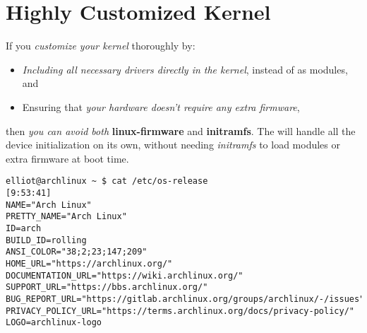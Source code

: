 
\newpage

\section{Highly Customized Kernel}
If you \textit{customize your kernel} thoroughly by:
\begin{itemize}
  \item \textit{Including all necessary drivers directly in the kernel}, instead of as modules, and
  \item Ensuring that \textit{your hardware doesn't require any extra firmware},
\end{itemize}

then \textit{you can avoid both} \textbf{linux-firmware} and \textbf{initramfs}. The {} will handle all the device initialization on its own, without needing \textit{initramfs} to load modules or extra firmware at boot time.


\begin{lstlisting}[caption={\smaller Sample Code}]
elliot@archlinux ~ $ cat /etc/os-release                                                     [9:53:41]
NAME="Arch Linux"
PRETTY_NAME="Arch Linux"
ID=arch
BUILD_ID=rolling
ANSI_COLOR="38;2;23;147;209"
HOME_URL="https://archlinux.org/"
DOCUMENTATION_URL="https://wiki.archlinux.org/"
SUPPORT_URL="https://bbs.archlinux.org/"
BUG_REPORT_URL="https://gitlab.archlinux.org/groups/archlinux/-/issues"
PRIVACY_POLICY_URL="https://terms.archlinux.org/docs/privacy-policy/"
LOGO=archlinux-logo
\end{lstlisting}
